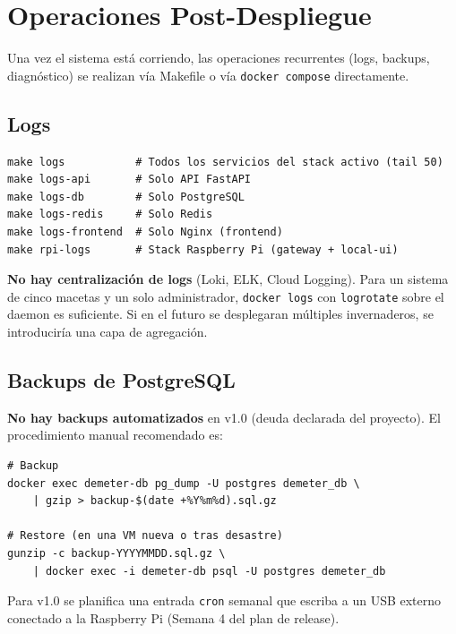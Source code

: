 \section{Operaciones Post-Despliegue}
\label{sec:despliegue_ops}

Una vez el sistema está corriendo, las operaciones recurrentes (logs, backups,
diagnóstico) se realizan vía Makefile o vía \texttt{docker compose} directamente.

\subsection{Logs}

\begin{lstlisting}[style=trama, caption={Atajos de logs por servicio}]
make logs           # Todos los servicios del stack activo (tail 50)
make logs-api       # Solo API FastAPI
make logs-db        # Solo PostgreSQL
make logs-redis     # Solo Redis
make logs-frontend  # Solo Nginx (frontend)
make rpi-logs       # Stack Raspberry Pi (gateway + local-ui)
\end{lstlisting}

\textbf{No hay centralización de logs} (Loki, ELK, Cloud Logging). Para un sistema
de cinco macetas y un solo administrador, \texttt{docker logs} con
\texttt{logrotate} sobre el daemon es suficiente. Si en el futuro se desplegaran
múltiples invernaderos, se introduciría una capa de agregación.

\subsection{Backups de PostgreSQL}

\textbf{No hay backups automatizados} en v1.0 (deuda declarada del proyecto). El
procedimiento manual recomendado es:

\begin{lstlisting}[style=trama, caption={Backup manual semanal de la base de datos}]
# Backup
docker exec demeter-db pg_dump -U postgres demeter_db \
    | gzip > backup-$(date +%Y%m%d).sql.gz

# Restore (en una VM nueva o tras desastre)
gunzip -c backup-YYYYMMDD.sql.gz \
    | docker exec -i demeter-db psql -U postgres demeter_db
\end{lstlisting}

Para v1.0 se planifica una entrada \texttt{cron} semanal que escriba a un USB
externo conectado a la Raspberry Pi (Semana 4 del plan de release).

